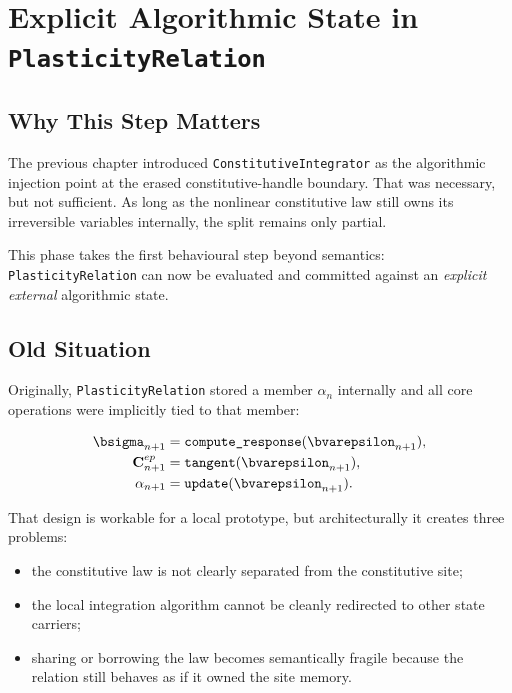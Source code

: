 \chapter{Explicit Algorithmic State in \texttt{PlasticityRelation}}

\section{Why This Step Matters}

The previous chapter introduced \texttt{ConstitutiveIntegrator} as the
algorithmic injection point at the erased constitutive-handle boundary.  That
was necessary, but not sufficient.  As long as the nonlinear constitutive law
still owns its irreversible variables internally, the split remains only
partial.

This phase takes the first behavioural step beyond semantics:
\texttt{PlasticityRelation} can now be evaluated and committed against an
\emph{explicit external} algorithmic state.

\section{Old Situation}

Originally, \texttt{PlasticityRelation} stored a member
\(\alpha_n\) internally and all core operations were implicitly tied to that
member:

\begin{align}
\bsigma_{n+1} &= \texttt{compute\_response}(\bvarepsilon_{n+1}), \\
\mathbf{C}_{n+1}^{ep} &= \texttt{tangent}(\bvarepsilon_{n+1}), \\
\alpha_{n+1} &= \texttt{update}(\bvarepsilon_{n+1}).
\end{align}

That design is workable for a local prototype, but architecturally it creates
three problems:

\begin{itemize}
  \item the constitutive law is not clearly separated from the constitutive
        site;
  \item the local integration algorithm cannot be cleanly redirected to other
        state carriers;
  \item sharing or borrowing the law becomes semantically fragile because the
        relation still behaves as if it owned the site memory.
\end{itemize}

